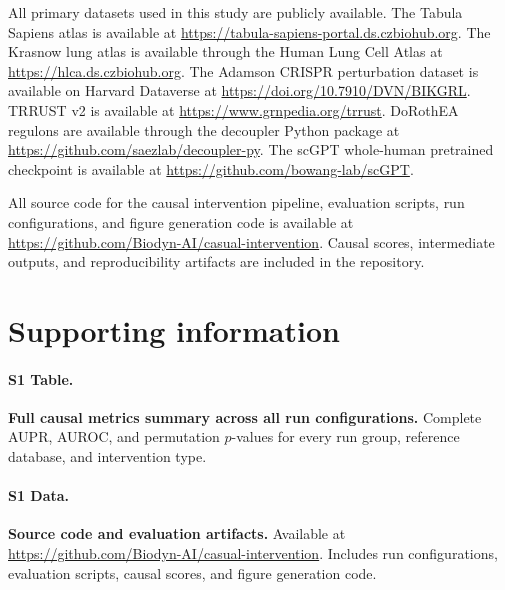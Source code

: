 \documentclass[10pt,letterpaper]{article}
\begin{document}
All primary datasets used in this study are publicly available. The Tabula
Sapiens atlas \cite{tabula_sapiens_2022} is available at
\url{https://tabula-sapiens-portal.ds.czbiohub.org}. The Krasnow lung atlas
\cite{travaglini_lung_2020} is available through the Human Lung Cell Atlas at
\url{https://hlca.ds.czbiohub.org}. The Adamson CRISPR perturbation dataset
\cite{adamson_cell_2016,adamson_dataverse_2022} is available on Harvard
Dataverse at \url{https://doi.org/10.7910/DVN/BIKGRL}. TRRUST v2
\cite{han_trrust_2015} is available at
\url{https://www.grnpedia.org/trrust}. DoRothEA regulons
\cite{dorothea_github} are available through the decoupler Python package at
\url{https://github.com/saezlab/decoupler-py}. The scGPT whole-human
pretrained checkpoint \cite{cui_scgpt_2023} is available at
\url{https://github.com/bowang-lab/scGPT}.

All source code for the causal intervention pipeline, evaluation scripts,
run configurations, and figure generation code is available at
\url{https://github.com/Biodyn-AI/casual-intervention}. Causal scores, intermediate outputs, and reproducibility
artifacts are included in the repository.





\section*{Supporting information}

\paragraph*{S1 Table.}
\label{S1_Table}
{\bf Full causal metrics summary across all run configurations.}
Complete AUPR, AUROC, and permutation $p$-values for every run group,
reference database, and intervention type.

\paragraph*{S1 Data.}
\label{S1_Data}
{\bf Source code and evaluation artifacts.}
Available at \url{https://github.com/Biodyn-AI/casual-intervention}. Includes run configurations, evaluation scripts,
causal scores, and figure generation code.
\end{document}
